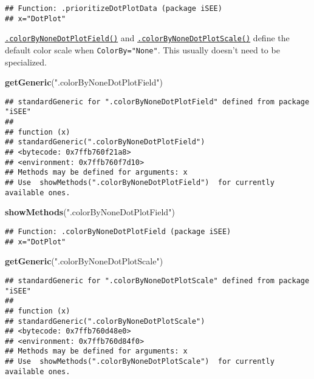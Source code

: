 \documentclass[
]{book}
\newenvironment{Shaded}{\begin{snugshade}}{\end{snugshade}}
\newcommand{\KeywordTok}[1]{\textcolor[rgb]{0.13,0.29,0.53}{\textbf{#1}}}
\newcommand{\NormalTok}[1]{#1}
\newcommand{\StringTok}[1]{\textcolor[rgb]{0.31,0.60,0.02}{#1}}
\begin{document}
\begin{verbatim}
## Function: .prioritizeDotPlotData (package iSEE)
## x="DotPlot"
\end{verbatim}

\href{https://isee.github.io/iSEE/reference/plot-generics.html}{\texttt{.colorByNoneDotPlotField()}} and \href{https://isee.github.io/iSEE/reference/plot-generics.html}{\texttt{.colorByNoneDotPlotScale()}} define the default color scale when \texttt{ColorBy="None"}.
This usually doesn't need to be specialized.

\begin{Shaded}
\begin{Highlighting}[]
\KeywordTok{getGeneric}\NormalTok{(}\StringTok{".colorByNoneDotPlotField"}\NormalTok{)}
\end{Highlighting}
\end{Shaded}

\begin{verbatim}
## standardGeneric for ".colorByNoneDotPlotField" defined from package "iSEE"
## 
## function (x) 
## standardGeneric(".colorByNoneDotPlotField")
## <bytecode: 0x7ffb760f21a8>
## <environment: 0x7ffb760f7d10>
## Methods may be defined for arguments: x
## Use  showMethods(".colorByNoneDotPlotField")  for currently available ones.
\end{verbatim}

\begin{Shaded}
\begin{Highlighting}[]
\KeywordTok{showMethods}\NormalTok{(}\StringTok{".colorByNoneDotPlotField"}\NormalTok{)}
\end{Highlighting}
\end{Shaded}

\begin{verbatim}
## Function: .colorByNoneDotPlotField (package iSEE)
## x="DotPlot"
\end{verbatim}

\begin{Shaded}
\begin{Highlighting}[]
\KeywordTok{getGeneric}\NormalTok{(}\StringTok{".colorByNoneDotPlotScale"}\NormalTok{)}
\end{Highlighting}
\end{Shaded}

\begin{verbatim}
## standardGeneric for ".colorByNoneDotPlotScale" defined from package "iSEE"
## 
## function (x) 
## standardGeneric(".colorByNoneDotPlotScale")
## <bytecode: 0x7ffb760d48e0>
## <environment: 0x7ffb760d84f0>
## Methods may be defined for arguments: x
## Use  showMethods(".colorByNoneDotPlotScale")  for currently available ones.
\end{verbatim}
\end{document}
